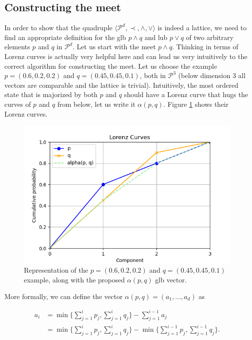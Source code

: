 \subsection{Constructing the meet} \label{sec:meet}

In order to show that the quadruple $\langle \mathcal{P}^d, \prec, \wedge, \vee \rangle$ is indeed a lattice, we need to find an appropriate definition for the glb $p \wedge q$ and lub $p \vee q$ of two arbitrary elements $p$ and $q$ in $\mathcal{P}^d$. Let us start with the meet $p \wedge q$. Thinking in terms of Lorenz curves is actually very helpful here and can lead us very intuitively to the correct algorithm for constructing the meet. Let us choose the example $p = (0.6, 0.2, 0.2)$ and $q = (0.45, 0.45, 0.1)$, both in $\mathcal{P}^3$ (below dimension 3 all vectors are comparable and the lattice is trivial). Intuitively, the most ordered state that is majorized by both $p$ and $q$ should have a Lorenz curve that hugs the curves of $p$ and $q$ from below, let us write it $\alpha(p, q)$. Figure \ref{fig:meet_attempt} shows their Lorenz curves.

\begin{figure}[h!]
    \centering
    \includegraphics[scale=0.6]{images/meet_intuition.png}
    \caption{Representation of the $p = (0.6, 0.2, 0.2)$ and $q = (0.45, 0.45, 0.1)$ example, along with the proposed $\alpha(p, q)$ glb vector.} \label{fig:meet_attempt}
\end{figure}

\noindent More formally, we can define the vector $\alpha(p, q) = (a_1, \dots , a_d)$ as

\begin{align}
    a_i &= \min \Big\{ \sum_{j=1}^{i} p_j , \sum_{j=1}^{i} q_j \Big\} - \sum_{j=1}^{i-1} a_j \label{eq:alpha_bis} \\
    &= \min \Big\{ \sum_{j=1}^{i} p_j , \sum_{j=1}^{i} q_j \Big\} - \min \Big\{ \sum_{j=1}^{i-1} p_j , \sum_{j=1}^{i-1} q_j \Big\}. \label{eq:alpha}
\end{align}


